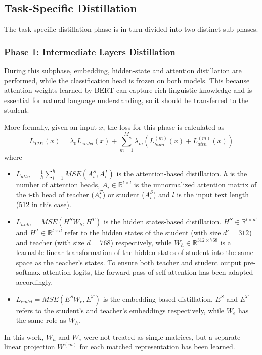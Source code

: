 \documentclass[11pt, a4paper]{article}
\begin{document}
\subsection{Task-Specific Distillation}
The task-specific distillation phase is in turn divided into two distinct sub-phases.
\subsubsection{Phase 1: Intermediate Layers Distillation}
During this subphase, embedding, hidden-state and attention distillation are performed, while the classification head is frozen on both models. This because attention weights learned by BERT can capture rich linguistic knowledge and is essential for natural language understanding, so it should be transferred to the student.

More formally, given an input $x$, the loss for this phase is calculated as
\begin{equation}
  L_{TD1}(x) = \lambda_0 L_{embd}(x) + \sum_{m=1}^M \lambda_m (L^{(m)}_{hidn}(x) + L^{(m)}_{attn}(x))
\end{equation}
where
\begin{itemize}
  \item $L_{attn} = \frac{1}{h} \sum_{i=1}^h MSE(A_i^S, A_i^T)$ is the attention-based distillation. $h$ is the number of attention heads, $A_i \in \mathbb{R}^{l \times l}$ is the unnormalized attention matrix of the i-th head of teacher ($A^T_i$) or student ($A^S_i$) and $l$ is the input text length (512 in this case).
  \item $L_{hidn} = MSE(H^S W_h, H^T)$ is the hidden states-based distillation. $H^S \in \mathbb{R}^{l \times d'}$ and $H^T \in \mathbb{R}^{l \times d}$ refer to the hidden states of the student (with size $d' = 312$) and teacher (with size $d = 768$) respectively, while $W_h \in \mathbb{R}^{312 \times 768}$ is a learnable linear transformation of the hidden states of student into the same space as the teacher's states. To ensure both teacher and student output pre-softmax attention logits, the forward pass of self-attention has been adapted accordingly.
  \item $L_{embd} = MSE(E^SW_e, E^T)$ is the embedding-based distillation. $E^S$ and $E^T$ refers to the student's and teacher's embeddings respectively, while $W_e$ has the same role as $W_h$.
\end{itemize}
In this work, $W_h$ and $W_e$ were not treated as single matrices, but a separate linear projection $W^{(m)}$ for each matched representation has been learned.
\end{document}
